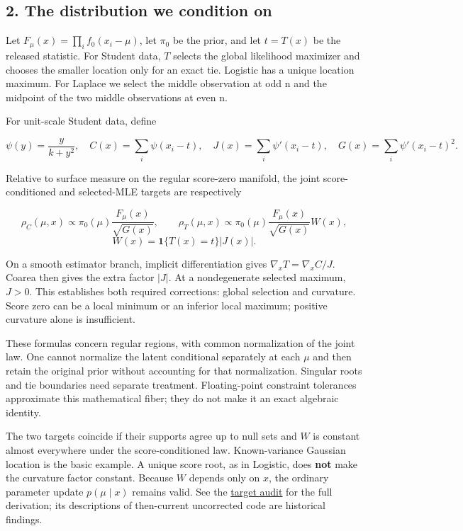 \documentclass[
  10pt,
]{article}
\begin{document}
\subsection{2. The distribution we condition
on}\label{the-distribution-we-condition-on}

Let \(F_\mu(x)=\prod_i f_0(x_i-\mu)\), let \(\pi_0\) be the prior, and
let \(t=T(x)\) be the released statistic. For Student data, \(T\)
selects the global likelihood maximizer and chooses the smaller location
only for an exact tie. Logistic has a unique location maximum. For
Laplace we select the middle observation at odd n and the midpoint of
the two middle observations at even n.

For unit-scale Student data, define

\[
\psi(y)=\frac{y}{k+y^2},\quad C(x)=\sum_i\psi(x_i-t),\quad
J(x)=\sum_i\psi'(x_i-t),\quad G(x)=\sum_i\psi'(x_i-t)^2.
\]

Relative to surface measure on the regular score-zero manifold, the
joint score-conditioned and selected-MLE targets are respectively

\[
\rho_C(\mu,x)\propto\pi_0(\mu)\frac{F_\mu(x)}{\sqrt{G(x)}},
\qquad
\rho_T(\mu,x)\propto\pi_0(\mu)\frac{F_\mu(x)}{\sqrt{G(x)}}W(x),
\] \[
W(x)=\mathbf1\{T(x)=t\}|J(x)|.
\]

On a smooth estimator branch, implicit differentiation gives
\(\nabla_xT=\nabla_xC/J\). Coarea then gives the extra factor \(|J|\).
At a nondegenerate selected maximum, \(J>0\). This establishes both
required corrections: global selection and curvature. Score zero can be
a local minimum or an inferior local maximum; positive curvature alone
is insufficient.

These formulas concern regular regions, with common normalization of the
joint law. One cannot normalize the latent conditional separately at
each \(\mu\) and then retain the original prior without accounting for
that normalization. Singular roots and tie boundaries need separate
treatment. Floating-point constraint tolerances approximate this
mathematical fiber; they do not make it an exact algebraic identity.

The two targets coincide if their supports agree up to null sets and
\(W\) is constant almost everywhere under the score-conditioned law.
Known-variance Gaussian location is the basic example. A unique score
root, as in Logistic, does \textbf{not} make the curvature factor
constant. Because \(W\) depends only on \(x\), the ordinary parameter
update \(p(\mu\mid x)\) remains valid. See the
\href{selected_mle_target_audit.md}{target audit} for the full
derivation; its descriptions of then-current uncorrected code are
historical findings.
\end{document}
